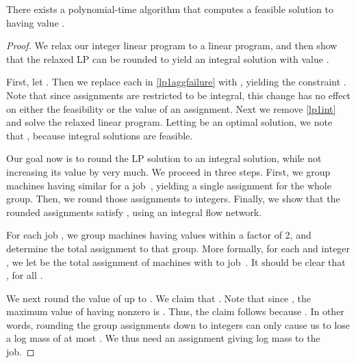\begin{lemma}
There exists a polynomial-time algorithm that computes a feasible
  solution to  having value
  .
\end{lemma}
\begin{proof}
  We relax our integer linear program to a linear program, and then
  show that the relaxed LP can be rounded to yield an integral
   solution with value
  .
  
  First, let .  Then we replace
  each  in \eqref{lp1aggfailure} with ,
  yielding the constraint .  Note that since assignments are restricted to be
  integral, this change has no effect on either the feasibility or the
  value of an assignment.  Next we remove \eqref{lp1int} and solve the
  relaxed linear program.  Letting  be an optimal
  solution, we note that , because
  integral solutions are feasible.
  
  Our goal now is to round the LP solution to an integral solution,
  while not increasing its value by very much.  We 
  proceed in three steps.  First, we group machines having
  similar  for a job~, yielding a single assignment for the
  whole group.  Then, we round those assignments to integers.
  Finally, we show that the rounded assignments satisfy
   , using an integral flow network.
  
   For each job , we group machines having  values
   within a factor of 2, and determine the total assignment to that
   group.  More formally, for each  and integer , we let
   \vspace{-.2em} be the total assignment of machines with
    to job~.  It should be clear that , for all
   .
  
  We next round the value of  up to .  We
  claim that .
  Note that since , the maximum value of 
  having nonzero  is .  Thus, the claim
  follows because .  In other words,
  rounding the group assignments down to integers can only cause us to
  lose a log mass of at most .  We thus need an assignment giving
   log mass to the job.  
  

\end{proof}
